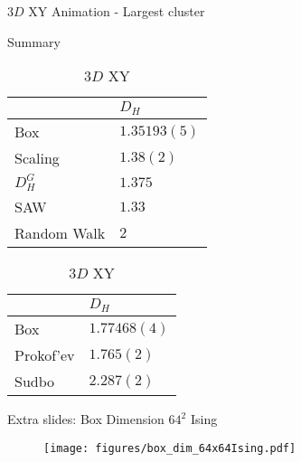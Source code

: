 \documentclass[10pt]{beamer}
\begin{document}
\begin{frame}{$3D$ XY Animation - Largest cluster}
\end{frame}

\begin{frame}{Summary}
    \begin{table}
        \parbox{.45\linewidth}{
            \centering
            \begin{tabular}{l|l}
                               & $D_H$          \\ \hline
                Box            & $1.35193(5)$   \\ \hline
                Scaling        & $1.38(2)$      \\ \hline
                $D_H^G$        & $1.375$        \\ \hline
                SAW            & $1.33$         \\ \hline
                Random Walk    & $2$                          
            \end{tabular}
            \caption{$2D$ Ising}
        }
        \hfill
        \parbox{.45\linewidth}{
            \centering
            \begin{tabular}{l|l}
                            & $D_H$           \\ \hline
                Box         & $1.77468(4)$    \\ \hline
                Prokof'ev   & $1.765(2)$      \\ \hline
                Sudbo       & $2.287(2)$  
            \end{tabular}
            \caption{$3D$ XY}
        }
    \end{table}
\end{frame}

\appendix

\begin{frame}[fragile]{Extra slides: Box Dimension $64^2$ Ising}
    \begin{figure}[h!]
        \centering
            \texttt{[image: figures/box\_dim\_64x64Ising.pdf]}
    \end{figure}
\end{frame}
\end{document}
